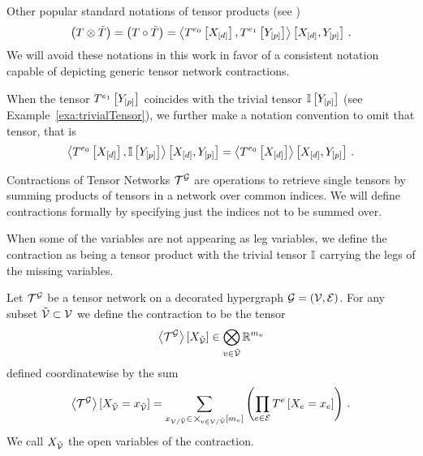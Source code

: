 Other popular standard notations of tensor products (see \cite{kolda_tensor_2009,hackbusch_tensor_2012,cichocki_tensor_2015})
	\[ \left(T \otimes \tilde{T}\right) = \left(T \circ \tilde{T}\right)
	= \left\langle T^{e_0}\left[X_{[d]}\right],T^{e_1}\left[Y_{[p]}\right]\right\rangle \left[ X_{[d]},Y_{[p]} \right]  \, . \]
We will avoid these notations in this work in favor of a consistent notation capable of depicting generic tensor network contractions.

When the tensor $T^{e_1}\left[Y_{[p]}\right]$ coincides with the trivial tensor $\mathbb{I}\left[Y_{[p]}\right]$ (see Example~\ref{exa:trivialTensor}), we further make a notation convention to omit that tensor, that is
\begin{align*}
	\left\langle T^{e_0}\left[X_{[d]}\right],\mathbb{I}\left[Y_{[p]}\right]\right\rangle \left[ X_{[d]},Y_{[p]} \right]
	= \left\langle T^{e_0}\left[X_{[d]}\right]\right\rangle \left[ X_{[d]},Y_{[p]} \right] \, .
\end{align*}




Contractions of Tensor Networks $\mathcal{T}^{\mathcal{G}}$ are operations to retrieve single tensors by summing products of tensors in a network over common indices.
We will define contractions formally by specifying just the indices not to be summed over.

When some of the variables are not appearing as leg variables, we define the contraction as being a tensor product with the trivial tensor $\mathbb{I}$ carrying the legs of the missing variables.

\begin{definition}\label{def:contraction}
	Let $\mathcal{T}^{\mathcal{G}}$ be a tensor network on a decorated hypergraph $\mathcal{G}=(\mathcal{V},\mathcal{E})$.
	For any subset $\tilde{\mathcal{V}}\subset\mathcal{V}$ we define the contraction  to be the tensor
	\begin{align}
		\left\langle \mathcal{T}^{\mathcal{G}}\right\rangle \left[ X_{\tilde{\mathcal{V}}} \right] \in \bigotimes_{v\in\tilde{\mathcal{V}}} \mathbb{R}^{m_{v}}
	\end{align}
	defined coordinatewise by the sum
	\begin{align}
		\left\langle \mathcal{T}^{\mathcal{G}}\right\rangle \left[ X_{\tilde{\mathcal{V}}}=x_{\tilde{\mathcal{V}}} \right] =
		\sum_{x_{\mathcal{V}/\tilde{\mathcal{V}}} \in\,\bigtimes_{v\in\mathcal{V}/\tilde{\mathcal{V}}}[m_{v}]}
		\left( \prod_{e\in\mathcal{E}}T^{e}\left[X_{e}=x_{e}\right] \right) \, .
	\end{align}
	We call $X_{\tilde{\mathcal{V}}}$ the open variables of the contraction.
\end{definition}


